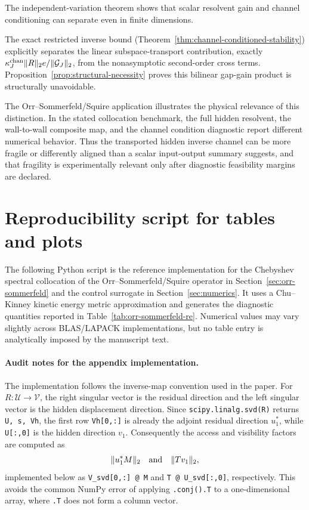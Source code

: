 \documentclass[review]{siamart220329}
\theoremstyle{definition}
\theoremstyle{remark}
\newcommand{\calU}{\mathcal{U}}
\newcommand{\calV}{\mathcal{V}}
\begin{document}
The independent-variation theorem shows that scalar resolvent gain and channel conditioning can separate even in finite dimensions.

The exact restricted inverse bound (Theorem~\ref{thm:channel-conditioned-stability}) explicitly separates the linear subspace-transport contribution, exactly $\kappa_J^{\rm chan} \|R\|_2 e / \| \mathcal{G}_J \|_2$, from the nonasymptotic second-order cross terms. Proposition~\ref{prop:structural-necessity} proves this bilinear gap-gain product is structurally unavoidable. 

The Orr--Sommerfeld/Squire application illustrates the physical relevance of this distinction. In the stated collocation benchmark, the full hidden resolvent, the wall-to-wall composite map, and the channel condition diagnostic report different numerical behavior. Thus the transported hidden inverse channel can be more fragile or differently aligned than a scalar input-output summary suggests, and that fragility is experimentally relevant only after diagnostic feasibility margins are declared.

\appendix
\section{Reproducibility script for tables and plots}\label{app:reproducibility}
The following Python script is the reference implementation for the Chebyshev spectral collocation of the Orr--Sommerfeld/Squire operator in Section~\ref{sec:orr-sommerfeld} and the control surrogate in Section~\ref{sec:numerics}. It uses a Chu--Kinney kinetic energy metric approximation and generates the diagnostic quantities reported in Table~\ref{tab:orr-sommerfeld-re}. Numerical values may vary slightly across BLAS/LAPACK implementations, but no table entry is analytically imposed by the manuscript text. 


\paragraph{Audit notes for the appendix implementation.}
The implementation follows the inverse-map convention used in the paper. For
$R:\calU\to\calV$, the right singular vector is the residual direction and the
left singular vector is the hidden displacement direction. Since
\texttt{scipy.linalg.svd(R)} returns \texttt{U, s, Vh}, the first row
\texttt{Vh[0,:]} is already the adjoint residual direction $u_1^*$, while
\texttt{U[:,0]} is the hidden direction $v_1$. Consequently the access and
visibility factors are computed as
\begin{equation}
    \|u_1^*M\|_2
    \quad\hbox{and}\quad
    \|Tv_1\|_2,
\end{equation}
implemented below as \texttt{V\_svd[0,:] @ M} and
\texttt{T @ U\_svd[:,0]}, respectively. This avoids the common NumPy error of
applying \texttt{.conj().T} to a one-dimensional array, where \texttt{.T} does
not form a column vector.
\end{document}
